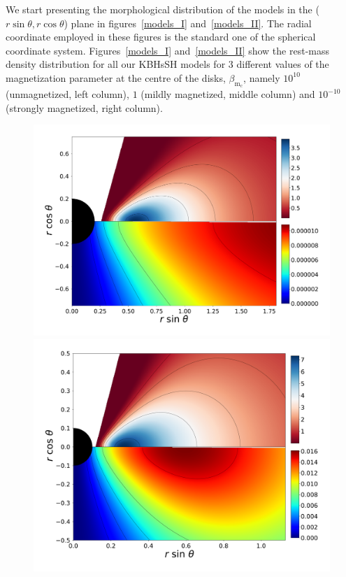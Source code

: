 \documentclass[twocolumn,aps,showpacs,showkeys,prd,superscriptaddress,byrevtex, amsmath]{revtex4-1}
\begin{document}
We start presenting the morphological distribution of the models in the ($r\sin\theta, r\cos\theta$) plane in figures~\ref{models_I} and~\ref{models_II}. The radial coordinate employed in these figures is the standard one of the spherical coordinate system. Figures~\ref{models_I} and~\ref{models_II} show the rest-mass density distribution for all our KBHsSH models for 3 different values of the magnetization parameter at the centre of the disks, $\beta_{\mathrm{m_c}}$, namely $10^{10}$ (unmagnetized, left column), $1$ (mildly magnetized, middle column) and $10^{-10}$ (strongly magnetized, right column). 

\begin{figure}
\centering
\includegraphics[scale=0.1267]{figures/fig5_I_10.pdf}
\hspace{-0.3cm}
\includegraphics[scale=0.12]{figures/fig5_IV_10.pdf}

\end{figure}
\end{document}
